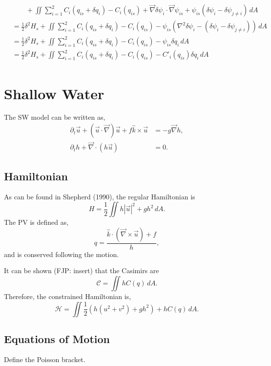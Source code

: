 \documentclass[12pt]{article}
\begin{document}
\begin{align*}
&\quad\quad + \iint \sum_{i=1}^2 C_i(q_{is} + \delta q_i) - C_i(q_{is}) + \vec\nabla\delta\psi_i \cdot \vec\nabla\psi_{is} + \psi_{is}(\delta\psi_i - \delta\psi_{j \ne i}) \, dA \\
&= \frac12 \delta^2 H_s + \iint \sum_{i=1}^2 C_i(q_{is} + \delta q_i) - C_i(q_{is}) - \psi_{is}(\nabla^2\delta\psi_i - (\delta\psi_i - \delta\psi_{j \ne i})) \, dA \\
&= \frac12 \delta^2 H_s + \iint \sum_{i=1}^2 C_i(q_{is} + \delta q_i) - C_i(q_{is}) - \psi_{is}\delta q_i \, dA \\
&= \frac12 \delta^2 H_s + \iint \sum_{i=1}^2 C_i(q_{is} + \delta q_i) - C_i(q_{is}) - C'_i(q_{is})\delta q_i \, dA \\
\end{align*}


\section{Shallow Water}
The SW model can be written as,
\begin{align*}
\partial_t \vec u + (\vec u \cdot \vec \nabla) \vec u + f \hat k \times \vec u &= - g \vec \nabla h, \\
\partial_t h + \vec\nabla \cdot \left( h \vec u \right) & = 0.
\end{align*}

\subsection{Hamiltonian}
As can be found in Shepherd (1990), the regular Hamiltonian is 
$$
H = \frac12 \iint h | \vec u |^2 + g h^2 \, dA.
$$
The PV is defined as,
$$
q = \frac{ \hat k \cdot (\vec \nabla \times \vec u) + f}{h},
$$
and is conserved following the motion.  

It can be shown (FJP: insert) that the Casimirs are
$$
\mathcal{C} = \iint hC(q) \, dA.
$$
Therefore, the constrained Hamiltonian is,
$$
\mathcal{H} =  \iint \frac12  \left( h (u^2 + v^2) + g h^2 \right) + h C(q) \, dA.
$$

\subsection{Equations of Motion}
Define the Poisson bracket.
\end{document}
